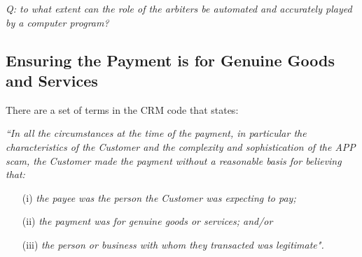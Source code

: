 \begin{center}\textit{Q: to what extent can the role of the arbiters  be automated and accurately played by a computer program?}
\end{center}

%

 \subsection{Ensuring the Payment is for Genuine Goods and Services}\label{sec:genuine-goods}
 
 
 
There are a set of terms in the CRM code  that states: 

\noindent\textit{``In all the circumstances at the time of the payment, in particular the characteristics of the Customer and the complexity and sophistication of the APP scam, the Customer made the payment without a reasonable basis for believing that:}
\begin{itemize}
\item[(i)] \textit{the payee was the person the Customer was expecting to pay;}
\item[(ii)] \textit{the payment was for genuine goods or services; and/or}
\item[(iii)] \textit{the person or business with whom they transacted was legitimate".}
\end{itemize}


